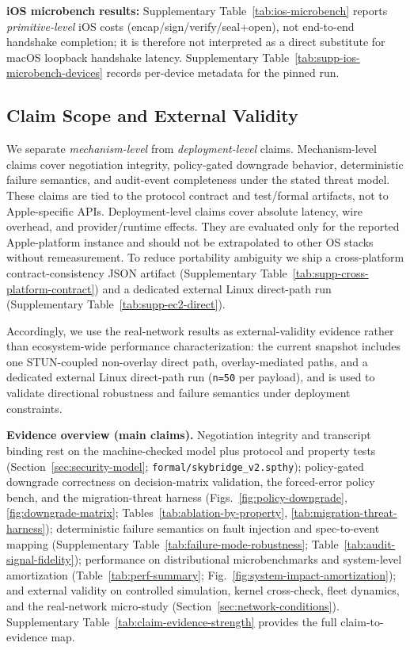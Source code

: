 \documentclass[10pt,journal,compsoc]{IEEEtran}
\begin{document}
\textbf{iOS microbench results:} Supplementary
Table~\ref{tab:ios-microbench} reports \emph{primitive-level} iOS costs
(encap/sign/verify/seal+open), not end-to-end handshake completion; it
is therefore not interpreted as a direct substitute for macOS loopback
handshake latency. Supplementary
Table~\ref{tab:supp-ios-microbench-devices} records per-device metadata
for the pinned run.

\subsection{Claim Scope and External Validity}\label{sec:claim-scope-validity}

We separate \emph{mechanism-level} from \emph{deployment-level} claims.
Mechanism-level claims cover negotiation integrity, policy-gated
downgrade behavior, deterministic failure semantics, and audit-event
completeness under the stated threat model. These claims are tied to the
protocol contract and test/formal artifacts, not to Apple-specific APIs.
Deployment-level claims cover absolute latency, wire overhead, and
provider/runtime effects. They are evaluated only for the reported
Apple-platform instance and should not be extrapolated to other OS
stacks without remeasurement. To reduce portability ambiguity we ship a
cross-platform contract-consistency JSON artifact (Supplementary
Table~\ref{tab:supp-cross-platform-contract}) and a dedicated external
Linux direct-path run (Supplementary Table~\ref{tab:supp-ec2-direct}).

Accordingly, we use the real-network results as external-validity
evidence rather than ecosystem-wide performance characterization: the
current snapshot includes one STUN-coupled non-overlay direct path,
overlay-mediated paths, and a dedicated external Linux direct-path run
(\texttt{n=50} per payload), and is used to validate directional
robustness and failure semantics under deployment constraints.

\textbf{Evidence overview (main claims).} Negotiation integrity and
transcript binding rest on the machine-checked model plus protocol and
property tests (Section~\ref{sec:security-model};
\texttt{formal/skybridge\_v2.spthy}); policy-gated downgrade correctness
on decision-matrix validation, the forced-error policy bench, and the
migration-threat harness (Figs.~\ref{fig:policy-downgrade},
\ref{fig:downgrade-matrix}; Tables~\ref{tab:ablation-by-property},
\ref{tab:migration-threat-harness}); deterministic failure semantics on
fault injection and spec-to-event mapping (Supplementary
Table~\ref{tab:failure-mode-robustness};
Table~\ref{tab:audit-signal-fidelity}); performance on distributional
microbenchmarks and system-level amortization
(Table~\ref{tab:perf-summary};
Fig.~\ref{fig:system-impact-amortization}); and external validity on
controlled simulation, kernel cross-check, fleet dynamics, and the
real-network micro-study (Section~\ref{sec:network-conditions}).
Supplementary Table~\ref{tab:claim-evidence-strength} provides the full
claim-to-evidence map.
\end{document}
